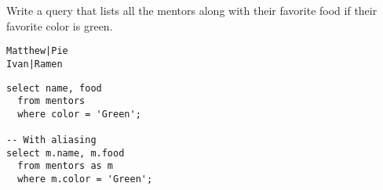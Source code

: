 \begin{blocksection}
\question Write a query that lists all the mentors along with their favorite food if their favorite color is green.

\begin{lstlisting}
Matthew|Pie
Ivan|Ramen
\end{lstlisting}

\begin{solution}[1in]
\begin{lstlisting}
select name, food
  from mentors
  where color = 'Green';
  
-- With aliasing
select m.name, m.food
  from mentors as m
  where m.color = 'Green';
\end{lstlisting}
\end{solution}
\end{blocksection}
